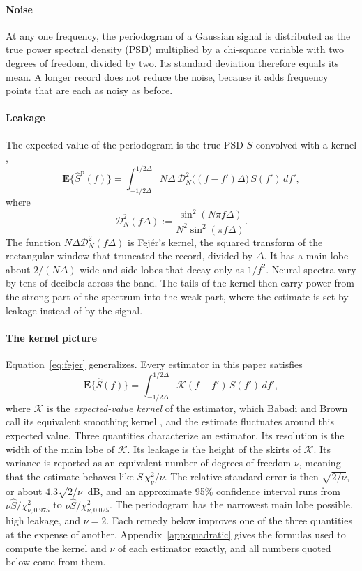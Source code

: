 \documentclass[10pt,twocolumn]{article}
\newcommand{\E}{\mathbf{E}}
\newcommand{\dd}{\,d}
\begin{document}
\paragraph{Noise} At any one frequency, the periodogram of a Gaussian signal is distributed as the true power spectral density (PSD) multiplied by a chi-square variable with two degrees of freedom, divided by two. Its standard deviation therefore equals its mean. A longer record does not reduce the noise, because it adds frequency points that are each as noisy as before.

\paragraph{Leakage} The expected value of the periodogram is the true PSD $S$ convolved with a kernel \cite{babadi2014},
\begin{equation}
\E\{\hat S^{\mathrm p}(f)\}=\int_{-1/2\Delta}^{1/2\Delta}N\Delta\,\mathcal{D}_N^2\bigl((f-f')\Delta\bigr)\,S(f')\dd f' ,
\label{eq:fejer}
\end{equation}
where
\begin{equation}
\mathcal{D}_N^2(f\Delta):=\frac{\sin^2(N\pi f\Delta)}{N^2\sin^2(\pi f\Delta)} .
\label{eq:fejerkernel}
\end{equation}
The function $N\Delta\mathcal{D}_N^2(f\Delta)$ is Fej\'er's kernel, the squared transform of the rectangular window that truncated the record, divided by $\Delta$. It has a main lobe about $2/(N\Delta)$ wide and side lobes that decay only as $1/f^2$. Neural spectra vary by tens of decibels across the band. The tails of the kernel then carry power from the strong part of the spectrum into the weak part, where the estimate is set by leakage instead of by the signal.

\paragraph{The kernel picture} Equation~\eqref{eq:fejer} generalizes. Every estimator in this paper satisfies
\begin{equation}
\E\{\hat S(f)\}=\int_{-1/2\Delta}^{1/2\Delta}\mathcal{K}(f-f')\,S(f')\dd f' ,
\label{eq:kernel}
\end{equation}
where $\mathcal{K}$ is the \emph{expected-value kernel} of the estimator, which Babadi and Brown call its equivalent smoothing kernel \cite{babadi2014}, and the estimate fluctuates around this expected value. Three quantities characterize an estimator. Its resolution is the width of the main lobe of $\mathcal{K}$. Its leakage is the height of the skirts of $\mathcal{K}$. Its variance is reported as an equivalent number of degrees of freedom $\nu$, meaning that the estimate behaves like $S\,\chi^2_\nu/\nu$. The relative standard error is then $\sqrt{2/\nu}$, or about $4.3\sqrt{2/\nu}$~dB, and an approximate 95\% confidence interval runs from $\nu\hat S/\chi^2_{\nu,0.975}$ to $\nu\hat S/\chi^2_{\nu,0.025}$. The periodogram has the narrowest main lobe possible, high leakage, and $\nu=2$. Each remedy below improves one of the three quantities at the expense of another. Appendix~\ref{app:quadratic} gives the formulas used to compute the kernel and $\nu$ of each estimator exactly, and all numbers quoted below come from them.
\end{document}
